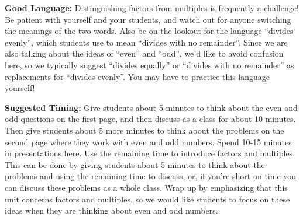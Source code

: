 \documentclass[nooutcomes,noauthor,handout]{ximera}
\begin{document}
\begin{instructorNotes}
{\bf Good Language:} Distinguishing factors from multiples is frequently a challenge! Be patient with yourself and your students, and watch out for anyone switching the meanings of the two words. Also be on the lookout for the language ``divides evenly'', which students use to mean ``divides with no remainder''. Since we are also talking about the ideas of ``even'' and ``odd'', we'd like to avoid confusion here, so we typically suggest ``divides equally'' or ``divides with no remainder'' as replacements for ``divides evenly''. You may have to practice this language yourself!



{\bf Suggested Timing:} Give students about 5 minutes to think about the even and odd questions on the first page, and then discuss as a class for about 10 minutes. Then give students about 5 more minutes to think about the  problems on the second page where they work with even and odd numbers. Spend 10-15 minutes in presentations here. Use the remaining time to introduce factors and multiples. This can be done by giving students about 5 minutes to think about the problems and using the remaining time to discuss, or, if you're short on time you can discuss these problems as a whole class. Wrap up by emphasizing that this unit concerns factors and multiples, so we would like students to focus on these ideas when they are thinking about even and odd numbers.

\end{instructorNotes}
\end{document}
